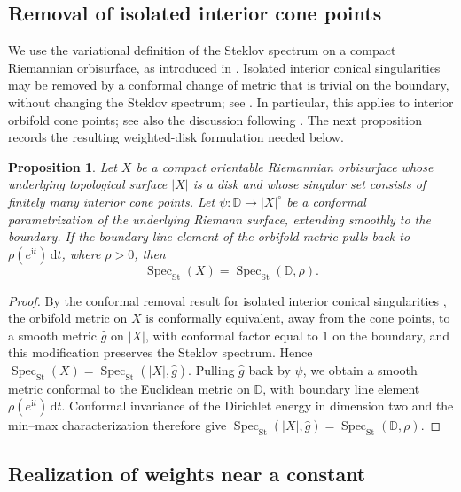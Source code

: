 \documentclass[11pt,letterpaper,reqno]{amsart}
\newtheorem{proposition}[proposition]{Proposition}
\theoremstyle{definition}
\newcommand{\D}{\mathbb D}
\newcommand{\SpecS}{\operatorname{Spec}_{\mathrm{St}}}
\newcommand{\dd}{\,\mathrm{d}}
\newcommand{\iu}{\mathrm{i}}
\begin{document}
\subsection{Removal of isolated interior cone points}

We use the variational definition of the Steklov spectrum on a compact
Riemannian orbisurface, as introduced in
\cite{AriasMarcoDrydenGordonHassannezhadRayStanhope2019}.
Isolated interior conical singularities may be removed by a conformal
change of metric that is trivial on the boundary, without changing the
Steklov spectrum; see \cite[Definition~2.6 and Remark~2.10]{ColboisGirouardGordonSher2024}.
In particular, this applies to interior orbifold cone points; see also
the discussion following
\cite[Corollary~8.20]{ColboisGirouardGordonSher2024}.
The next proposition records the resulting weighted-disk formulation
needed below.


\begin{proposition}
\label{prop:cone-removal}
Let $X$ be a compact orientable Riemannian orbisurface whose underlying
topological surface $|X|$ is a disk and whose singular set consists of
finitely many interior cone points. Let $\psi:\D\longrightarrow |X|^\circ$ be a conformal parametrization of the underlying Riemann surface,
extending smoothly to the boundary.  If the boundary line element of
the orbifold metric pulls back to
$\rho(e^{\iu t})\dd t$, where $\rho>0$, then
\[
\SpecS(X)=\SpecS(\D,\rho).
\]
\end{proposition}
\begin{proof}
By the conformal removal result for isolated interior conical
singularities
\cite[Remark~2.10]{ColboisGirouardGordonSher2024}, the orbifold
metric on $X$ is conformally equivalent, away from the cone points,
to a smooth metric $\widehat g$ on $|X|$, with conformal factor equal
to $1$ on the boundary, and this modification preserves the Steklov
spectrum. Hence $\SpecS(X)=\SpecS(|X|,\widehat g)$.
Pulling $\widehat g$ back by $\psi$, we obtain a smooth metric
conformal to the Euclidean metric on $\D$, with boundary line element
$\rho(e^{\iu t})\dd t$.  Conformal invariance of the Dirichlet energy
in dimension two and the min--max characterization therefore give $\SpecS(|X|,\widehat g)=\SpecS(\D,\rho)$.
\end{proof}


\subsection{Realization of weights near a constant}
\end{document}
